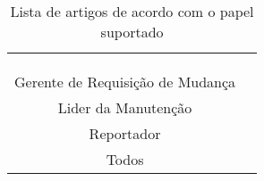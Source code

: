 \begin{table}[htbp]
{\begin{tabular}{@{}cl@{}}
 & \cite{Vijayakumar2014, gegick2010identifying, izquierdo2015gila, Tian2012} \\
 & \cite{malheiros2012source, Song2010a, mani2012ausum} \\
 & \cite{Tu:2014:MQI:2677832.2677844, Aggarwal:2014:MIT:2593801.2593810, Wong:2014:BBF:2705615.2706096} \\ \midrule
\multirow{3}{*}{Gerente de Requisição de Mudança} & \cite{Vijayakumar2014, mani2012ausum, hindle2016contextual} \\
 & \cite{gegick2010identifying, sun2010discriminative, alipour2013contextual, zhang2011bug} \\
 & \cite{Nagwani2010, kochhar2014automatic, banerjee2012automated, ValdiviaGarcia:2014:CPB:2597073.2597099} \\ \midrule
Lider da Manutenção & \cite{Vijayakumar2014, Tian2012, netto2010automated, Nagwani2010} \\ \midrule
\multirow{2}{*}{Reportador} & \cite{bettenburg2008makes, Tu:2014:MQI:2677832.2677844, Vijayakumar2014} \\
 & \cite{Moran:2015:EAA:2786805.2807557, Thung2014, moran2015auto} \\ \midrule
Todos & \cite{hora2012bug, takama2013application, dal2014bug} \\ \bottomrule
\end{tabular}%
}
\caption{Lista de artigos de acordo com o papel suportado}
\label{tab:taxonomia-suporte-papeis}
\end{table}